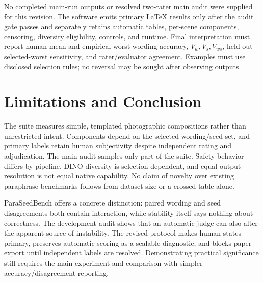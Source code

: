 \documentclass[10pt,letterpaper]{article}
\begin{document}
No completed main-run outputs or resolved two-rater main audit were supplied for this revision. The software emits primary LaTeX results only after the audit gate passes and separately retains automatic tables, per-scene components, censoring, diversity eligibility, controls, and runtime. Final interpretation must report human mean and empirical worst-wording accuracy, $V_w,V_s,V_{ws}$, held-out selected-worst sensitivity, and rater/evaluator agreement. Examples must use disclosed selection rules; no reversal may be sought after observing outputs.

\section{Limitations and Conclusion}
The suite measures simple, templated photographic compositions rather than unrestricted intent. Components depend on the selected wording/seed set, and primary labels retain human subjectivity despite independent rating and adjudication. The main audit samples only part of the suite. Safety behavior differs by pipeline, DINO diversity is selection-dependent, and equal output resolution is not equal native capability. No claim of novelty over existing paraphrase benchmarks follows from dataset size or a crossed table alone.

ParaSeedBench offers a concrete distinction: paired wording and seed disagreements both contain interaction, while stability itself says nothing about correctness. The development audit shows that an automatic judge can also alter the apparent source of instability. The revised protocol makes human states primary, preserves automatic scoring as a scalable diagnostic, and blocks paper export until independent labels are resolved. Demonstrating practical significance still requires the main experiment and comparison with simpler accuracy/disagreement reporting.
\end{document}

